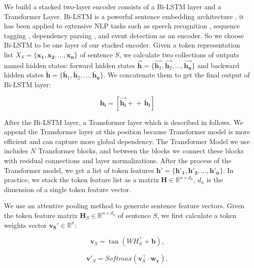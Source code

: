 \documentclass[conference]{IEEEtran}
\begin{document}
We build a stacked two-layer encoder consists of a Bi-LSTM layer and a Transformer Layer.
Bi-LSTM \cite{hochreiter_long_1997, schuster_bidirectional_1997} is a powerful sentence embedding architecture \cite{lin_structured_2017}, it has been applied to extensive NLP tasks such as
speech recognition \cite{sak_long_2014}, sequence tagging \cite{huang_bidirectional_2015}, dependency parsing \cite{kiperwasser_simple_2016}, and event detection \cite{feng_language-independent_2018}
as an encoder.
So we choose Bi-LSTM to be one layer of our stacked encoder.
Given a token representation list $X_S = \{ \bm{x_1}, \bm{x_2}, \dots, \bm{x_n} \}$  of sentence $S$, we calculate two collections
of outputs named hidden states:
forward hidden states $\overrightarrow{\bm{h}} = \{\overrightarrow{\bm{h}_1}, \overrightarrow{\bm{h}_2}, \dots, \overrightarrow{\bm{h_n}}\}$
and backward hidden states $\overleftarrow{\bm{h}} = \{\overleftarrow{\bm{h}_1}, \overleftarrow{\bm{h}_2}, \dots, \overleftarrow{\bm{h_n}}\}$.
We concatenate them to get the final output of Bi-LSTM layer:

\begin{equation}
\bm{h_i} = \left [ \overrightarrow{\bm{h_i}} +\!\!\!\!+\,  \overleftarrow{\bm{h_i}} \right ]
\end{equation}

After the Bi-LSTM layer, a Transformer layer which is described in \cite{vaswani_attention_2017} follows.
We append the Transformer layer at this position because Transformer model is more efficient and can capture more global dependency.
The Transformer Model we use includes $N$ Transformer blocks, and between the blocks we connect these blocks with residual connections and layer normalizations.
After the process of the Transformer model, we get a list of token features $\bm{h'} = \{ \bm{h'_1}, \bm{h'_2}, \dots, \bm{h'_n} \}$.
In practice, we stack the token feature list as a matrix $\bm{\text{H}} \in \mathbb{R}^{n \times d_h}$, $d_h$ is the dimension of a single token feature vector.

We use an attentive pooling method to generate sentence feature vectors.
Given the token feature matrix $\bm{H}_S \in \mathbb{R}^{n \times d_h}$ of sentence $S$, we first calculate a token weights vector $\bm{v_S'} \in \mathbb{R}^{n}$:

\begin{equation}
\bm{v}_S = \tan \left ( W H_S^{\top} + \bm{b} \right ),
\end{equation}

\begin{equation}
\bm{v'}_S = Softmax \left (  \bm{v}_S^{\top} \cdot \bm{w_v} \right ),
\end{equation}
\end{document}
